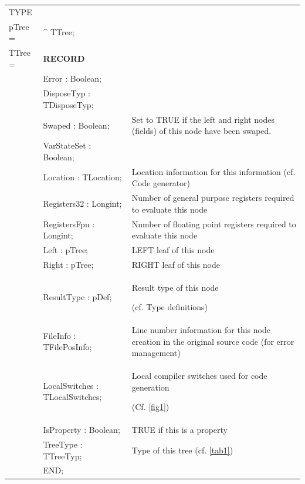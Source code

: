 \documentclass [a4paper,12pt]{article}
\begin{document}
\begin{tabular*}{6.5in}{|l@{\extracolsep{\fill}}lp{8.0cm}|}
\hline
\textsf{TYPE}& & \\
\xspace pTree = & \^{}  TTree; & \\
\xspace \textsf{TTree} = & \textbf{RECORD}& \\
 & \textsf{Error : Boolean;}&  \\
 &\textsf{DisposeTyp : TDisposeTyp;}&
 \\
 &\textsf{Swaped : Boolean;}&
Set to TRUE if the left and right nodes (fields) of this node have been swaped. \\
 & \textsf{VarStateSet : Boolean;}&
 \\
 & \textsf{Location : TLocation;}&
Location information for this information (cf. Code generator) \\
 & \textsf{Registers32 : Longint;}&
Number of general purpose registers required to evaluate this node \\
 & \textsf{RegistersFpu : Longint;}&
Number of floating point registers required to evaluate this node \\
 & \textsf{Left : pTree;}&
LEFT leaf of this node \\
 & \textsf{Right : pTree;}&
RIGHT leaf of this node \\
 & \textsf{ResultType : pDef;}&
Result type of this node  \par (cf. Type definitions) \\
 & \textsf{FileInfo : TFilePosInfo;}&
Line number information for this node creation in the original source code (for error management) \\
 & \textsf{LocalSwitches : TLocalSwitches;}&
Local compiler switches used for code generation \par (Cf. \ref{fig1}) \\
 & \textsf{IsProperty : Boolean;}&
TRUE if this is a property \\
 & \textsf{TreeType : TTreeTyp;}&
Type of this tree (cf. \ref{tab1}) \\
 & \textsf{END;}&   \\
\hline
\end{tabular*}
\end{document}
